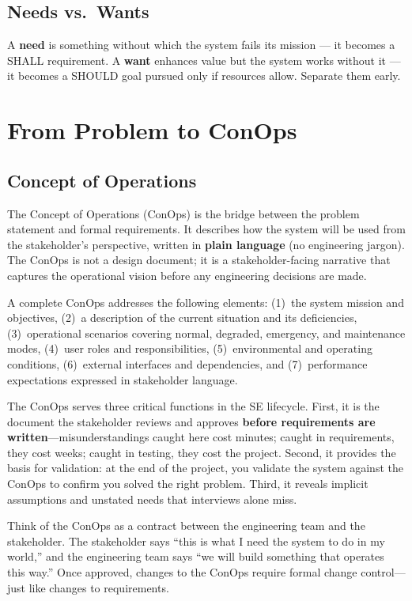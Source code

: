 \documentclass[11pt,letterpaper,twoside,openany]{book}
\begin{document}
\subsection{Needs vs.\ Wants}
A \textbf{need} is something without which the system fails its mission --- it becomes a SHALL requirement. A \textbf{want} enhances value but the system works without it --- it becomes a SHOULD goal pursued only if resources allow. Separate them early.

\FloatBarrier
\section{From Problem to ConOps}
\subsection{Concept of Operations}
The Concept of Operations (ConOps) is the bridge between the problem statement and formal requirements. It describes how the system will be used from the stakeholder's perspective, written in \textbf{plain language} (no engineering jargon). The ConOps is not a design document; it is a stakeholder-facing narrative that captures the operational vision before any engineering decisions are made.

A complete ConOps addresses the following elements: (1)~the system mission and objectives, (2)~a description of the current situation and its deficiencies, (3)~operational scenarios covering normal, degraded, emergency, and maintenance modes, (4)~user roles and responsibilities, (5)~environmental and operating conditions, (6)~external interfaces and dependencies, and (7)~performance expectations expressed in stakeholder language.

The ConOps serves three critical functions in the SE lifecycle. First, it is the document the stakeholder reviews and approves \textbf{before requirements are written}---misunderstandings caught here cost minutes; caught in requirements, they cost weeks; caught in testing, they cost the project. Second, it provides the basis for validation: at the end of the project, you validate the system against the ConOps to confirm you solved the right problem. Third, it reveals implicit assumptions and unstated needs that interviews alone miss.

\begin{tipbox}
Think of the ConOps as a contract between the engineering team and the stakeholder. The stakeholder says ``this is what I need the system to do in my world,'' and the engineering team says ``we will build something that operates this way.'' Once approved, changes to the ConOps require formal change control---just like changes to requirements.
\end{tipbox}
\end{document}
